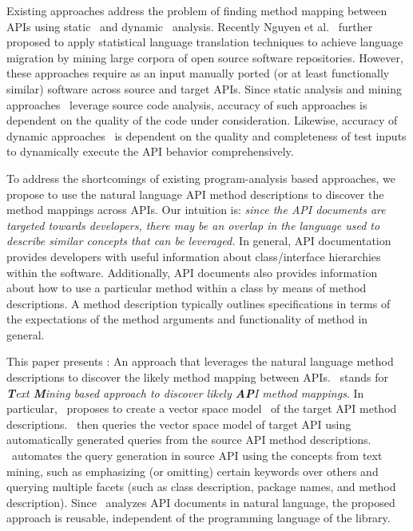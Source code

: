 Existing approaches
address the problem of finding method mapping between APIs using
static~\cite{Zhong2010ICSE} and dynamic~\cite{Gokhale2013ICSE} analysis. 
Recently Nguyen et al.~\cite{nguyen2014statistical} further proposed to
apply statistical language translation techniques to achieve language migration
by mining large corpora of open source software repositories.
However, these approaches require as an input manually ported
(or at least functionally similar) software across source and target APIs.
Since static analysis and mining approaches~\cite{Zhong2010ICSE,nguyen2014statistical}
leverage source code analysis, 
accuracy of such approaches is dependent on the quality of the code under consideration.
Likewise, accuracy of dynamic approaches~\cite{Gokhale2013ICSE} is dependent on
the quality and completeness of test inputs
to dynamically execute the API behavior comprehensively. 


To address the shortcomings of existing program-analysis based approaches,
we propose to use the natural language API method descriptions
to discover the method mappings across APIs.
Our intuition is:
\textit{since the API documents are targeted towards developers,
	there may be an overlap in the language used to describe similar concepts that can be leveraged.}
In general, API documentation provides developers with useful information
about class/interface hierarchies within the software.
Additionally, API documents also provides information about
how to use a particular method within a class by means of method descriptions.
A method description typically outlines specifications in terms of
the expectations of the method arguments and functionality of method in general.


This paper presents \tool : An approach that leverages the natural language method descriptions to discover the likely method mapping between APIs.
\tool\ stands for \textit{\textbf{T}ext \textbf{M}ining
	based approach to discover likely \textbf{AP}I method mappings}.
In particular, \tool\ proposes to create a vector space model~\cite{singhal2001modern,manning2008introduction} of the target API method descriptions. 
\tool\ then queries the vector space model of target API using
automatically generated queries from the source API method descriptions.
\tool\ automates the query generation in source API using the concepts from text mining, such as emphasizing (or omitting) certain keywords over others and querying multiple facets (such as class description, package names, and method description).
Since \tool\ analyzes API documents in natural language, the proposed approach is reusable, independent of the programming language of the library.

